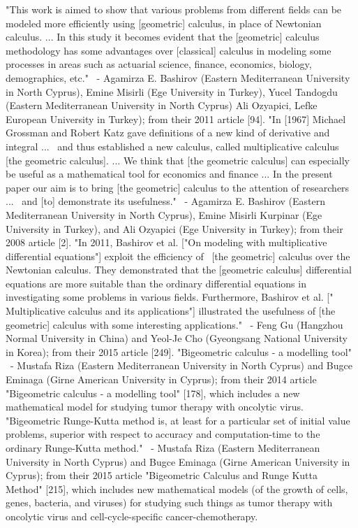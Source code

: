 \documentclass[12pt]{article}
\begin{document}
"This work is aimed to show that various problems from different fields can be modeled more efficiently using [geometric] calculus, in place of Newtonian calculus. ... In this study it becomes evident that the [geometric] calculus methodology has some advantages over [classical] calculus in modeling some processes in areas such as actuarial science, finance, economics, biology, demographics, etc."  - Agamirza E. Bashirov (Eastern Mediterranean University in North Cyprus), Emine Misirli (Ege University in Turkey), Yucel Tandogdu (Eastern Mediterranean University in North Cyprus) Ali Ozyapici, Lefke European University in Turkey); from their 2011 article [94].
"In [1967] Michael Grossman and Robert Katz gave definitions of a new kind of derivative and integral ...  and thus established a new calculus, called multiplicative calculus [the geometric calculus]. ... We think that [the geometric calculus] can especially be useful as a mathematical tool for economics and finance ... In the present paper our aim is to bring [the geometric] calculus to the attention of researchers ...  and [to] demonstrate its usefulness."  - Agamirza E. Bashirov (Eastern Mediterranean University in North Cyprus), Emine Misirli Kurpinar (Ege University in Turkey), and Ali Ozyapici (Ege University in Turkey); from their 2008 article [2].
"In 2011, Bashirov et al. ["On modeling with multiplicative differential equations"] exploit the efficiency of  [the geometric] calculus over the Newtonian calculus. They demonstrated that the [geometric calculus] differential equations are more suitable than the ordinary differential equations in investigating some problems in various fields. Furthermore, Bashirov et al. [" Multiplicative calculus and its applications"] illustrated the usefulness of [the geometric] calculus with some interesting applications."  - Feng Gu (Hangzhou Normal University in China) and Yeol-Je Cho (Gyeongsang National University in Korea); from their 2015 article [249].
"Bigeometric calculus - a modelling tool"  - Mustafa Riza (Eastern Mediterranean University in North Cyprus) and Bugce Eminaga (Girne American University in Cyprus); from their 2014 article "Bigeometric calculus - a modelling tool" [178], which includes a new mathematical model for studying tumor therapy with oncolytic virus.
"Bigeometric Runge-Kutta method is, at least for a particular set of initial value problems, superior with respect to accuracy and computation-time to the ordinary Runge-Kutta method."  - Mustafa Riza (Eastern Mediterranean University in North Cyprus) and Bugce Eminaga (Girne American University in Cyprus); from their 2015 article "Bigeometric Calculus and Runge Kutta Method" [215], which includes new mathematical models (of the growth of cells, genes, bacteria, and viruses) for studying such things as tumor therapy with oncolytic virus and cell-cycle-specific cancer-chemotherapy.
\end{document}
